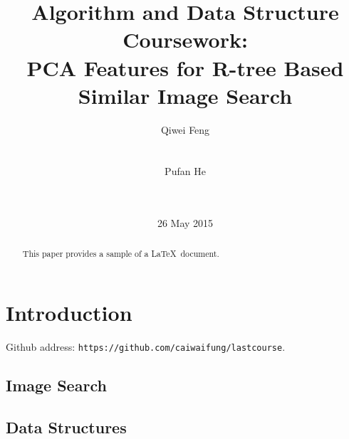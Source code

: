 \documentclass{acm_proc_article-sp}
\begin{document}
\title{Algorithm and Data Structure Coursework: \\PCA Features for
R-tree Based Similar Image Search}
\subtitle{}
%
%
\author{
%
%
\alignauthor
Qiwei Feng\\
       \\
       \\
\alignauthor
Pufan He\\
       \\
       \\
}
\date{26 May 2015}

\maketitle
\begin{abstract}
This paper provides a sample of a \LaTeX\ document.
\end{abstract}


\section{Introduction}

Github address: \texttt{https://github.com/caiwaifung/lastcourse}.

\subsection{Image Search}

\subsection{Data Structures}
\end{document}
